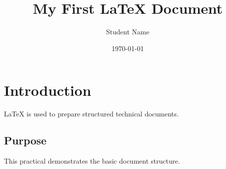 \documentclass[12pt,a4paper]{article}
\title{My First LaTeX Document}
\author{Student Name}
\date{\today}
\begin{document}
\maketitle
\section{Introduction}
LaTeX is used to prepare structured technical documents.
\subsection{Purpose}
This practical demonstrates the basic document structure.
\end{document}
